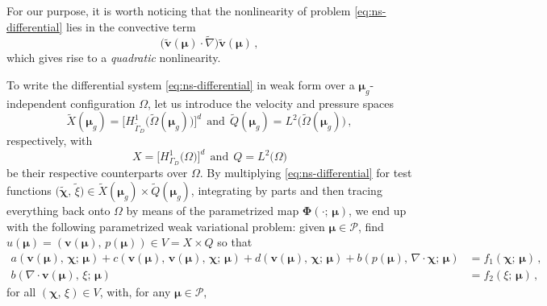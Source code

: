 \documentclass{elsarticle}
\theoremstyle{theorem}
\theoremstyle{definition}
\theoremstyle{remark}
\theoremstyle{proposition}
\numberwithin{figure}{section}
\newcommand{\wt}[1]{\widetilde{#1}}
\newcommand{\bg}[1]{\boldsymbol{#1}}
\begin{document}
		For our purpose, it is worth noticing that the nonlinearity of problem \eqref{eq:ns-differential} lies in the convective term
		\begin{equation*}
			\big( \wt{\bg{v}}(\bg{\mu}) \cdot \wt{\nabla} \big) \wt{\bg{v}}(\bg{\mu}) \, ,
		\end{equation*}
		which gives rise to a \emph{quadratic} nonlinearity. %
		
		To write the differential system \eqref{eq:ns-differential} in weak form over a $\bg{\mu}_g$-independent configuration $\Omega$, let us introduce the velocity and pressure spaces \[ \wt{X}(\bg{\mu}_g) = \big[ H^1_{\wt{\Gamma}_D} \big( \wt{\Omega}(\bg{\mu}_g) \big) \big]^d ~~ \text{and} ~~ \wt{Q}(\bg{\mu}_g) = L^2 \big( \wt{\Omega}(\bg{\mu}_g) \big) \, , \] respectively, with \[ X = \big[ H^1_{\Gamma_D} \big( \Omega \big) \big]^d ~~ \text{and} ~~ Q = L^2 \big( \Omega \big) \] be their respective counterparts over $\Omega$. By multiplying \eqref{eq:ns-differential} for test functions $\big( \wt{\bg{\chi}}, \, \wt{\xi} \big) \in \wt{X}(\bg{\mu}_g) \times \wt{Q}(\bg{\mu}_g)$, integrating by parts and then tracing everything back onto $\Omega$ by means of the parametrized map $\bg{\Phi}(\cdot; \, \bg{\mu})$, we end up with the following parametrized weak variational problem: given $\bg{\mu} \in \mathcal{P}$, find $u(\bg{\mu}) = (\bg{v}(\bg{\mu}), \, p(\bg{\mu})) \in V = X \times Q$ so that
		\begin{subequations}
			\label{eq:ns-weak-reference}
			\begin{align}
				a(\bg{v}(\bg{\mu}), \, \bg{\chi}; \, \bg{\mu}) + c(\bg{v}(\bg{\mu}), \, \bg{v}(\bg{\mu}), \, \bg{\chi}; \, \bg{\mu}) + d(\bg{v}(\bg{\mu}), \, \bg{\chi}; \, \bg{\mu}) + b(p(\bg{\mu}), \, \nabla \cdot \bg{\chi}; \, \bg{\mu}) & = f_1(\bg{\chi}; \, \bg{\mu}) \, , \\
				b(\nabla \cdot \bg{v}(\bg{\mu}), \, \xi; \, \bg{\mu}) & = f_2(\xi; \, \bg{\mu}) \, ,
			\end{align}
		\end{subequations}
		for all $(\bg{\chi}, \, \xi) \in V$, with, for any $\bg{\mu} \in \mathcal{P}$,	
\end{document}
